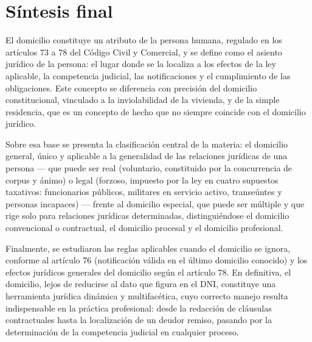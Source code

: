 \documentclass[12pt,oneside]{book}
\begin{document}
\chapter*{Síntesis final}

El domicilio constituye un atributo de la persona humana, regulado en los artículos 73 a 78 del Código Civil y Comercial, y se define como el asiento jurídico de la persona: el lugar donde se la localiza a los efectos de la ley aplicable, la competencia judicial, las notificaciones y el cumplimiento de las obligaciones. Este concepto se diferencia con precisión del domicilio constitucional, vinculado a la inviolabilidad de la vivienda, y de la simple residencia, que es un concepto de hecho que no siempre coincide con el domicilio jurídico.

Sobre esa base se presenta la clasificación central de la materia: el domicilio general, único y aplicable a la generalidad de las relaciones jurídicas de una persona --- que puede ser real (voluntario, constituido por la concurrencia de corpus y ánimo) o legal (forzoso, impuesto por la ley en cuatro supuestos taxativos: funcionarios públicos, militares en servicio activo, transeúntes y personas incapaces) --- frente al domicilio especial, que puede ser múltiple y que rige solo para relaciones jurídicas determinadas, distinguiéndose el domicilio convencional o contractual, el domicilio procesal y el domicilio profesional.

Finalmente, se estudiaron las reglas aplicables cuando el domicilio se ignora, conforme al artículo 76 (notificación válida en el último domicilio conocido) y los efectos jurídicos generales del domicilio según el artículo 78. En definitiva, el domicilio, lejos de reducirse al dato que figura en el DNI, constituye una herramienta jurídica dinámica y multifacética, cuyo correcto manejo resulta indispensable en la práctica profesional: desde la redacción de cláusulas contractuales hasta la localización de un deudor remiso, pasando por la determinación de la competencia judicial en cualquier proceso.
\end{document}
